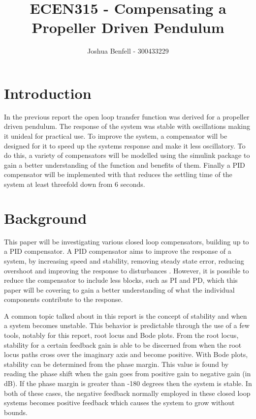 \documentclass[a4paper, 11pt, compsoc]{IEEEtran}
\title{ECEN315 - Compensating a Propeller Driven Pendulum }
\author{Joshua Benfell - 300433229}
\begin{document}
    \maketitle
    \IEEEdisplaynontitleabstractindextext

    \section{Introduction}\label{sec:intro}
		In the previous report the open loop transfer function was derived for a propeller driven pendulum. The response of the system was stable with oscillations making it unideal for practical use. To improve the system, a compensator will be designed for it to speed up the systems response and make it less oscillatory. To do this, a variety of compensators will be modelled using the simulink package to gain a better understanding of the function and benefits of them. Finally a PID compensator will be implemented with that reduces the settling time of the system at least threefold down from 6 seconds.
	\section{Background}\label{sec:bg}
		This paper will be investigating various closed loop compensators, building up to a PID compensator. A PID compensator aims to improve the response of a system, by increasing speed and stability, removing steady state error, reducing overshoot and improving the response to disturbances \cite{elprocus}. However, it is possible to reduce the compensator to include less blocks, such as PI and PD, which this paper will be covering to gain a better understanding of what the individual components contribute to the response.
		\par
		A common topic talked about in this report is the concept of stability and when a system becomes unstable. This behavior is predictable through the use of a few tools, notably for this report, root locus and Bode plots. From the root locus, stability for a certain feedback gain is able to be discerned from when the root locus paths cross over the imaginary axis and become positive. With Bode plots, stability can be determined from the phase margin. This value is found by reading the phase shift when the gain goes from positive gain to negative gain (in dB). If the phase margin is greater than -180 degrees then the system is stable. In both of these cases, the negative feedback normally employed in these closed loop systems becomes positive feedback which causes the system to grow without bounds.
\end{document}
